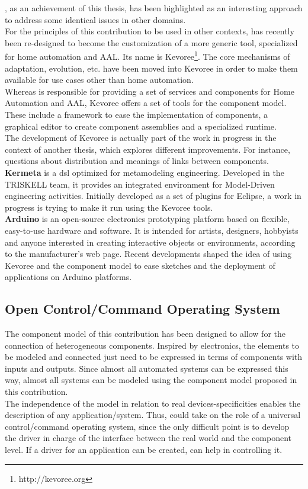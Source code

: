 \enti{}, as an achievement of this thesis, has been highlighted as an interesting approach to address some identical issues in other domains.\\

For the principles of this contribution to be used in other contexts, \enti{} has recently been re-designed to become the customization of a more generic tool, specialized for home automation and AAL. Its name is Kevoree\footnote{http://kevoree.org}. The core mechanisms of adaptation, evolution, etc. have been moved into Kevoree in order to make them available for use cases other than home automation.\\

Whereas \enti{} is responsible for providing a set of services and components for Home Automation and AAL, Kevoree offers a set of tools for the component model. These include a framework to ease the implementation of components, a graphical editor to create component assemblies and a specialized runtime.\\
The development of Kevoree is actually part of the work in progress in the context of another thesis, which explores different improvements. For instance, questions about distribution and meanings of links between components.\\

{\bf Kermeta} is a \gls{dsl} optimized for metamodeling engineering. Developed in the TRISKELL team, it provides an integrated environment for Model-Driven engineering activities. Initially developed as a set of plugins for Eclipse, a work in progress is trying to make it run using the Kevoree tools.\\

{\bf Arduino} is an open-source electronics prototyping platform based on flexible, easy-to-use hardware and software. It is intended for artists, designers, hobbyists and anyone interested in creating interactive objects or environments, according to the manufacturer's web page. Recent developments shaped the idea of using Kevoree and the component model to ease sketches and the deployment of applications on Arduino platforms.


\subsection{Open Control/Command Operating System}

The component model of this contribution has been designed to allow for the connection of heterogeneous components. Inspired by electronics, the elements to be modeled and connected just need to be expressed in terms of components with inputs and outputs. Since almost all automated systems can be expressed this way, almost all systems can be modeled using the component model proposed in this contribution.\\
The independence of the model in relation to real devices-specificities enables the description of any application/system. Thus, \enti{} could take on the role of a universal control/command operating system, since the only difficult point is to develop the driver in charge of the interface between the real world and the component level. If a driver for an application can be created, \enti{} can help in controlling it.


